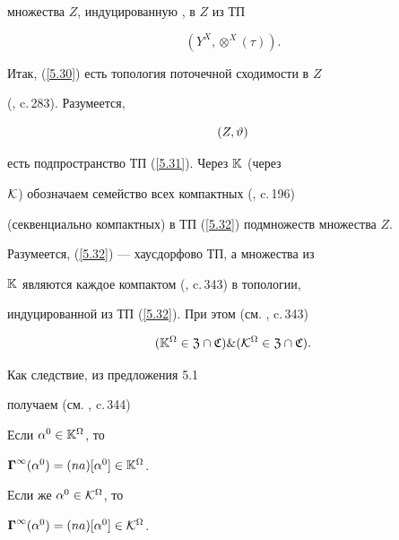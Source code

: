 множества $Z$, индуцированную \cite{57}, \cite{58} в $Z$ из ТП


\begin{equation}\label{5.31}


({Y^X},{{\otimes}^X}(\tau)).


\end{equation}


Итак, (\ref{5.30}) есть топология поточечной сходимости в $Z$


(\cite{57}, c.\,283). Разумеется,


\begin{equation}\label{5.32}


(Z,\vt)


\end{equation}


есть подпространство ТП (\ref{5.31}). Через $\Bbb{K}$ (через


$\cal{K}$) обозначаем семейство всех компактных (\cite{58}, c.\,196)


(секвенциально компактных) в ТП (\ref{5.32}) подмножеств множества $Z$.


Разумеется, (\ref{5.32}) --- хаусдорфово ТП, а множества из


$\Bbb{K}$ являются каждое компактом (\cite{55}, c.\,343) в топологии,


индуцированной из ТП (\ref{5.32}). При этом (см. \cite{55}, c.\,343)


$$


({\Bbb{K}}^\Om \in {\frak Z}\cap{\frak C}) \& ({\cal{K}}^\Om


\in {\frak Z}\cap{\frak C}).


$$


Как следствие, из предложения 5.1


получаем (см. \cite{55}, c.\,344)








\begin{props}


Если ${{\alpha}^0} \in {\Bbb{K}}^\Omega$, то


${{\boldsymbol\Gamma}^\infty}({\alpha}^0) = (na)[{\alpha}^0] \in {\Bbb{K}}^\Omega$.


Если же ${{\alpha}^0} \in {\cal{K}}^\Omega$, то


${{\mG}^\infty}({\alpha}^0) = (na)[{\alpha}^0] \in


{{\cal{K}}^\Om}$.


\end{props}








